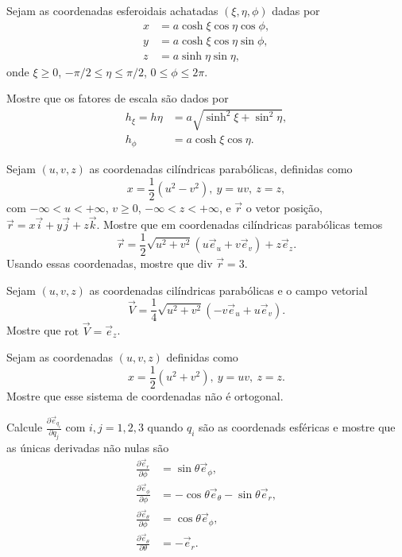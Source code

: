 \documentclass[a4paper,12pt,answers]{exam}
\newcommand{\devp}[2]{\frac{\partial #1}{\partial #2}}
\begin{document}
\begin{questions}
  \question Sejam as coordenadas esferoidais achatadas $(\xi, \eta, \phi)$ dadas por
  \begin{align*}
	x &= a \cosh \xi \cos \eta \cos \phi, \\
	y &= a \cosh \xi \cos \eta \sin \phi, \\
	z &= a \sinh \eta \sin \eta,
  \end{align*}
  onde $\xi \geq 0$, $-\pi/2 \leq \eta \leq \pi/2$, $0 \leq \phi \leq 2\pi$.
  
  Mostre que os fatores de escala s\~{a}o dados por
  \begin{align*}
	h_\xi = h\eta &= a \sqrt{\sinh^2 \xi + \sin^2 \eta}, \\
	h_\phi &= a \cosh \xi \cos \eta.
  \end{align*}
  \begin{solution}
	
  \end{solution}

  \question Sejam $(u, v, z)$ as coordenadas cil\'{i}ndricas parab\'{o}licas, definidas como
  \[
  x = \frac{1}{2} (u^2 - v^2), \ y = uv, \ z = z,
  \]
  com $-\infty < u < +\infty$, $v \geq 0$, $-\infty < z < +\infty$, e $\vec{r}$ o vetor posi\c{c}\~{a}o, $\vec{r} = x \vec{i} + y \vec{j} + z \vec{k}$. Mostre que em coordenadas cil\'{i}ndricas parab\'{o}licas temos
  \[
  \vec{r} = \frac{1}{2} \sqrt{u^2 + v^2} (u \vec{e}_u + v \vec{e}_v) + z \vec{e}_z.
  \]
  Usando essas coordenadas, mostre que $\mbox{div } \vec{r} = 3$.
  \begin{solution}
	
  \end{solution}

  \question Sejam $(u, v, z)$ as coordenadas cil\'{i}ndricas parab\'{o}licas e o campo vetorial
  \[
  \vec{V} = \frac{1}{4} \sqrt{u^2 + v^2} (-v \vec{e}_u + u \vec{e}_v).
  \]
  Mostre que $\mbox{rot } \vec{V} = \vec{e}_z$.
  \begin{solution}
	
  \end{solution}

  \question Sejam as coordenadas $(u, v, z)$ definidas como
  \[
  x = \frac{1}{2} (u^2 + v^2), \ y = uv, \ z = z.
  \]
  Mostre que esse sistema de coordenadas n\~{a}o \'{e} ortogonal.
  \begin{solution}
	
  \end{solution}

  \question Calcule $\devp{\vec{e}_{q_i}}{q_j}$ com $i, j = 1, 2, 3$ quando $q_i$ s\~{a}o as coordenads esf\'{e}ricas e mostre que as únicas derivadas n\~{a}o nulas s\~{a}o
  \begin{align*}
	\devp{\vec{e}_r}{\phi} &= \sin \theta \vec{e}_\phi, \\
	\devp{\vec{e}_\phi}{\phi} &= -\cos \theta \vec{e}_\theta - \sin \theta \vec{e}_r, \\
	\devp{\vec{e}_\theta}{\phi} &= \cos \theta \vec{e}_\phi, \\
	\devp{\vec{e}_\theta}{\theta} &= -\vec{e}_r.
  \end{align*}
  \begin{solution}
	

\end{solution}
\end{questions}
\end{document}
